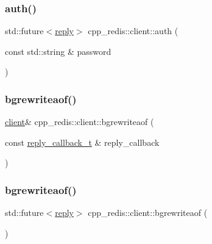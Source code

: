\mbox{\label{classcpp__redis_1_1client_a899b98d4d6da0ffdf8780933fe088fd1}} 
\subsubsection{\texorpdfstring{auth()}{auth()}\hspace{0.1cm}{\footnotesize\ttfamily [2/2]}}
{\footnotesize\ttfamily std\+::future$<$\hyperlink{classcpp__redis_1_1reply}{reply}$>$ cpp\+\_\+redis\+::client\+::auth (\begin{DoxyParamCaption}\item[{const std\+::string \&}]{password }\end{DoxyParamCaption})}

\mbox{\label{classcpp__redis_1_1client_a9873619c2c1ff820fde17e27ade096c8}} 
\subsubsection{\texorpdfstring{bgrewriteaof()}{bgrewriteaof()}\hspace{0.1cm}{\footnotesize\ttfamily [1/2]}}
{\footnotesize\ttfamily \hyperlink{classcpp__redis_1_1client}{client}\& cpp\+\_\+redis\+::client\+::bgrewriteaof (\begin{DoxyParamCaption}\item[{const \hyperlink{classcpp__redis_1_1client_a061a1140d36d2eaeda82b09a0bb3f9f2}{reply\+\_\+callback\+\_\+t} \&}]{reply\+\_\+callback }\end{DoxyParamCaption})}

\mbox{\label{classcpp__redis_1_1client_a82959607f4cbe9dac195d27621a9cc64}} 
\subsubsection{\texorpdfstring{bgrewriteaof()}{bgrewriteaof()}\hspace{0.1cm}{\footnotesize\ttfamily [2/2]}}
{\footnotesize\ttfamily std\+::future$<$\hyperlink{classcpp__redis_1_1reply}{reply}$>$ cpp\+\_\+redis\+::client\+::bgrewriteaof (\begin{DoxyParamCaption}{ }\end{DoxyParamCaption})}


